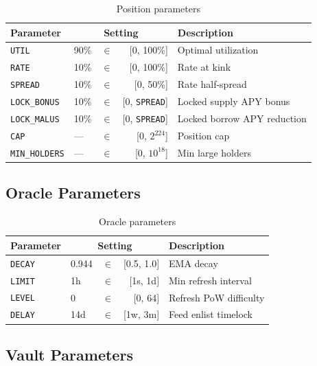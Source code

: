 \documentclass[10pt,a4paper,twocolumn]{article}
\theoremstyle{definition}
\theoremstyle{plain}
\theoremstyle{remark}
\begin{document}
\begin{table}[H]
\centering
\caption{Position parameters}
\label{tab:position-params}
\small
\begin{tabularx}{0.95\columnwidth}{@{}l l@{\,}c@{\,}r X@{}}
\toprule
Parameter & \multicolumn{3}{c}{Setting} & Description \\
\midrule
\texttt{UTIL} & 90\% & $\in$ & [0, 100\%] & Optimal utilization \\
\texttt{RATE} & 10\% & $\in$ & [0, 100\%] & Rate at kink \\
\texttt{SPREAD} & 10\% & $\in$ & [0, 50\%] & Rate half-spread \\
\texttt{LOCK\_BONUS} & 10\% & $\in$ & [0, \texttt{SPREAD}] & Locked supply APY bonus \\
\texttt{LOCK\_MALUS} & 10\% & $\in$ & [0, \texttt{SPREAD}] & Locked borrow APY reduction \\
\texttt{CAP} & --- & $\in$ & [0, $2^{224}$] & Position cap \\
\texttt{MIN\_HOLDERS} & --- & $\in$ & [0, $10^{18}$] & Min large holders \\
\bottomrule
\end{tabularx}
\end{table}

\subsection{Oracle Parameters}

\begin{table}[H]
\centering
\caption{Oracle parameters}
\label{tab:oracle-params}
\small
\begin{tabularx}{0.95\columnwidth}{@{}l l@{\,}c@{\,}r X@{}}
\toprule
Parameter & \multicolumn{3}{c}{Setting} & Description \\
\midrule
\texttt{DECAY} & 0.944 & $\in$ & [0.5, 1.0] & EMA decay \\
\texttt{LIMIT} & 1h & $\in$ & [1s, 1d] & Min refresh interval \\
\texttt{LEVEL} & 0 & $\in$ & [0, 64] & Refresh PoW difficulty \\
\texttt{DELAY} & 14d & $\in$ & [1w, 3m] & Feed enlist timelock \\
\bottomrule
\end{tabularx}
\end{table}

\subsection{Vault Parameters}
\end{document}

